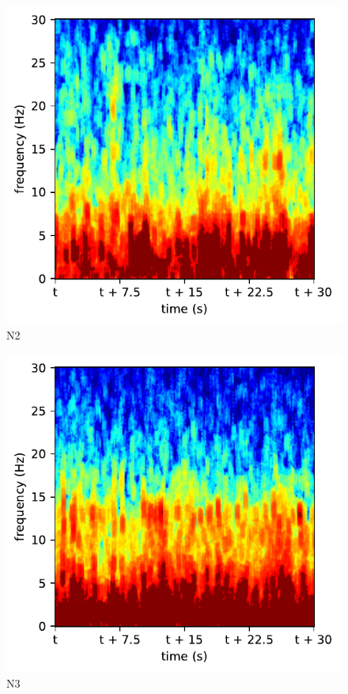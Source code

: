 \begin{subfigure}{.16\textwidth}
  \centering
  \includegraphics[width=1\linewidth]{./pics/class_clean_2}
  \caption{N2}
  \label{fig_1_13}
\end{subfigure}%
\begin{subfigure}{.16\textwidth}
  \centering
  \includegraphics[width=1\linewidth]{./pics/class_clean_3}
  \caption{N3}
  \label{fig_1_14}
\end{subfigure}%
